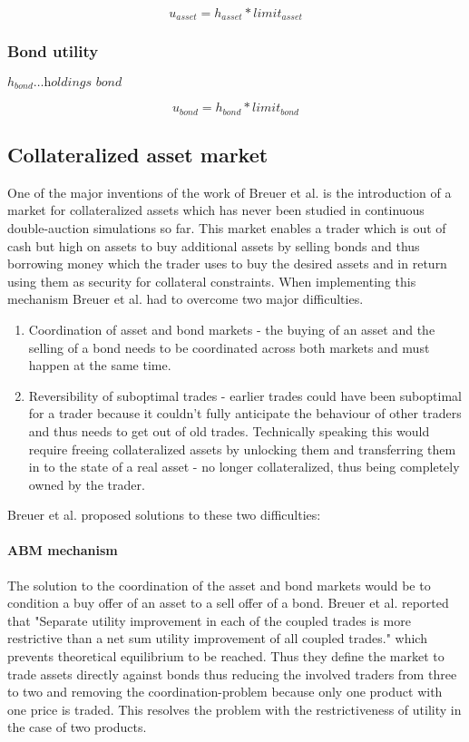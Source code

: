 \documentclass[../Bachelorarbeit.tex]{subfiles}
\begin{document}
\begin{equation}
u_{asset} = h_{asset} * limit_{asset}
\end{equation}

\subsubsection{Bond utility}
$h_{bond} \dots \textit{holdings bond}$ 

\begin{equation}
u_{bond} = h_{bond} * limit_{bond}
\end{equation}

\subsection{Collateralized asset market}
One of the major inventions of the work of Breuer et al. is the introduction of a market for collateralized assets which has never been studied in continuous double-auction simulations so far. This market enables a trader which is out of cash but high on assets to buy additional assets by selling bonds and thus borrowing money which the trader uses to buy the desired assets and in return using them as security for collateral constraints. When implementing this mechanism Breuer et al. had to overcome two major difficulties.

\begin{enumerate}
\item Coordination of asset and bond markets - the buying of an asset and the selling of a bond needs to be coordinated across both markets and must happen at the same time.
\item Reversibility of suboptimal trades - earlier trades could have been suboptimal for a trader because it couldn't fully anticipate the behaviour of other traders and thus needs to get out of old trades. Technically speaking this would require freeing collateralized assets by unlocking them and transferring them in to the state of a real asset - no longer collateralized, thus being completely owned by the trader.
\end{enumerate}

Breuer et al. proposed solutions to these two difficulties:
\paragraph{ABM mechanism}
The solution to the coordination of the asset and bond markets would be to condition a buy offer of an asset to a sell offer of a bond. Breuer et al. reported that "Separate utility improvement in each of the coupled trades is more restrictive than a net sum utility improvement of all coupled trades." which prevents theoretical equilibrium to be reached. Thus they define the market to trade assets directly against bonds thus reducing the involved traders from three to two and removing the coordination-problem because only one product with one price is traded. This resolves the problem with the restrictiveness of utility in the case of two products.
\end{document}
